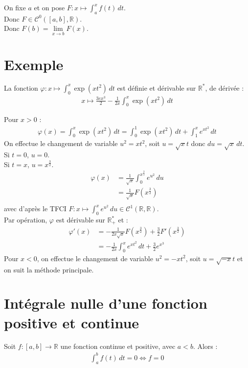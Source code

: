 \documentclass[../main.tex]{subfiles}
\begin{document}
\noindent On fixe $a$ et on pose $F:x\mapsto \int_{a}^{x} f(t) \,dt$. \\
Donc $F\in \mathcal{C}^0([a, b], \mathbb{R})$. \\
Donc $F(b) = \lim\limits_{x\to b} F(x)$. 

\section{Exemple}
\begin{tcolorbox}[title=Exemple 26.68, title filled=false, colframe=darkgreen, colback=darkgreen!10!white]
    La fonction $\varphi:x\mapsto \int_{0}^{x} \exp (xt^2) \,dt$ est définie et dérivable sur $\mathbb{R}^*$, de dérivée : 
    \begin{align*}
        x\mapsto \frac{3e{x^3}}{2} - \frac{1}{2x} \int_{0}^{x} \exp (xt^2) \,dt
    \end{align*}
\end{tcolorbox}

\noindent Pour $x > 0$ : 
\begin{align*}
    \varphi(x) = \int_{0}^{x} \exp (xt^2) \,dt = \int_{0}^{1} \exp (xt^2) \,dt + \int_{1}^{x} e^{xt^2} \,dt
\end{align*}
On effectue le changement de variable $u^2 = xt^2$, soit $u = \sqrt{x} t$ donc $du = \sqrt{x} \,dt$. \\
Si $t = 0$, $u = 0$. \\
Si $t = x$, $u = x^{\frac{3}{2}}$. 
\begin{align*}
    \varphi(x) &= \frac{1}{\sqrt{x}} \int_{0}^{x^{\frac{3}{2}}} e^{u^2} \,du \\
    &= \frac{1}{\sqrt{x}} F(x^{\frac{3}{2}}) \\
\end{align*}
avec d'après le TFCI $F:x\mapsto \int_{0}^{x} e^{u^2} \,du \in \mathcal{C}^1(\mathbb{R}, \mathbb{R})$. \\
Par opération, $\varphi$ est dérivable sur $\mathbb{R}_+^*$ et : 
\begin{align*}
    \varphi'(x) &= -\frac{1}{2x \sqrt{x}} F(x^{\frac{3}{2}}) + \frac{3}{2} F'(x^{\frac{3}{2}}) \\
    &= -\frac{1}{2x} \int_{0}^{x} e^{xt^2} \,dt + \frac{3}{2} e^{x^{3}}
\end{align*}
Pour $x < 0$, on effectue le changement de variable $u^2 = -xt^2$, soit $u = \sqrt{-x} t$ et on suit la méthode principale. 

\section{Intégrale nulle d'une fonction positive et continue}
\begin{tcolorbox}[title=Propostion 26.69, title filled=false, colframe=lightblue, colback=lightblue!10!white]
    Soit $f:[a, b]\to \mathbb{R}$ une fonction continue et positive, avec $a < b$. Alors : 
    \begin{align*}
        \int_{a}^{b} f(t) \,dt = 0 \Leftrightarrow f = 0
    \end{align*}
\end{tcolorbox}
\end{document}

